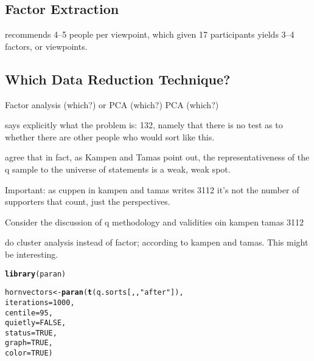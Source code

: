 \documentclass{article}\usepackage[]{graphicx}\usepackage[]{color}
\makeatletter
\newcommand{\hlnum}[1]{\textcolor[rgb]{0.686,0.059,0.569}{#1}}%
\newcommand{\hlstr}[1]{\textcolor[rgb]{0.192,0.494,0.8}{#1}}%
\newcommand{\hlstd}[1]{\textcolor[rgb]{0.345,0.345,0.345}{#1}}%
\newcommand{\hlkwb}[1]{\textcolor[rgb]{0.69,0.353,0.396}{#1}}%
\newcommand{\hlkwc}[1]{\textcolor[rgb]{0.333,0.667,0.333}{#1}}%
\newcommand{\hlkwd}[1]{\textcolor[rgb]{0.737,0.353,0.396}{\textbf{#1}}}%
\newenvironment{kframe}{%
 \def\at@end@of@kframe{}%
 \ifinner\ifhmode%
  \def\at@end@of@kframe{\end{minipage}}%
  \begin{minipage}{\columnwidth}%
 \fi\fi%
 \def\FrameCommand##1{\hskip\@totalleftmargin \hskip-\fboxsep
 \colorbox{shadecolor}{##1}\hskip-\fboxsep
     \hskip-\linewidth \hskip-\@totalleftmargin \hskip\columnwidth}%
 \MakeFramed {\advance\hsize-\width
   \@totalleftmargin\z@ \linewidth\hsize
   \@setminipage}}%
 {\par\unskip\endMakeFramed%
 \at@end@of@kframe}
\newenvironment{knitrout}{}{} %
\makeatother
\begin{document}
\subsection{Factor Extraction}

\cite[6]{Exel2005} recommends 4--5 people per viewpoint, which given 17 participants yields 3--4 factors, or viewpoints.

\subsection{Which Data Reduction Technique?}

Factor analysis (which?)
or
PCA (which?)
PCA (which?)

\cite{Wittenborn} says explicitly what the problem is: 132, namely that there is no test as to whether there are other people who would sort like this.

agree that in fact, as Kampen and Tamas point out, the representativeness of the q sample to the universe of statements is a weak, weak spot.

Important: as cuppen in  kampen and tamas writes 3112 it's not the number of supporters that count, just the perspectives.

Consider the discussion of q methodology and validities oin kampen tamas 3112

do cluster analysis instead of factor; according to kampen and tamas. This might be interesting.


\begin{knitrout}
\color{fgcolor}\begin{kframe}
\begin{alltt}
\hlkwd{library}\hlstd{(paran)}
\end{alltt}


{\ttfamily\noindent\itshape\color{messagecolor}{\#\# Loading required package: MASS}}\begin{alltt}
\hlstd{hornvectors} \hlkwb{<-} \hlkwd{paran}\hlstd{(}\hlkwd{t}\hlstd{(q.sorts[,,}\hlstr{"after"}\hlstd{]),}
                        \hlkwc{iterations} \hlstd{=} \hlnum{1000}\hlstd{,}
                        \hlkwc{centile} \hlstd{=} \hlnum{95}\hlstd{,}
                        \hlkwc{quietly} \hlstd{=} \hlnum{FALSE}\hlstd{,}
                        \hlkwc{status} \hlstd{=} \hlnum{TRUE}\hlstd{,}
                        \hlkwc{graph} \hlstd{=} \hlnum{TRUE}\hlstd{,}
                        \hlkwc{color} \hlstd{=} \hlnum{TRUE}\hlstd{)}
\end{alltt}


{\ttfamily\noindent\bfseries\color{errorcolor}{\#\# Error in t(q.sorts[, , "{}after"{}]): object 'q.sorts' not found}}\end{kframe}
\end{knitrout}
\end{document}
